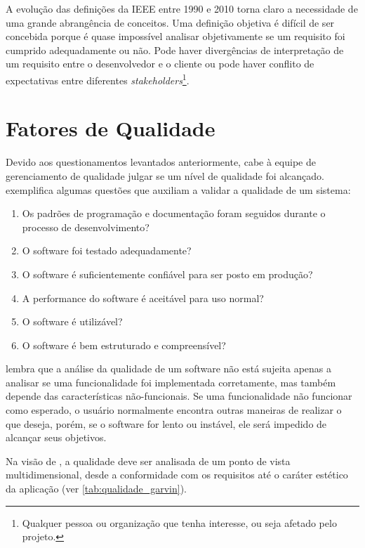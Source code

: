 \documentclass[
	12pt,				%
	openright,			%
	oneside,			%
	a4paper,			%
	english,			%
	brazil,				%
	]{abntex2}
\begin{document}
A evolução das definições da IEEE entre 1990 e 2010 torna claro a necessidade de uma grande abrangência de conceitos. Uma definição objetiva é difícil de ser concebida porque é quase impossível analisar objetivamente se um requisito foi cumprido adequadamente ou não. Pode haver divergências de interpretação de um requisito entre o desenvolvedor e o cliente ou pode haver conflito de expectativas entre diferentes \emph{stakeholders}\footnote{Qualquer pessoa ou organização que tenha interesse, ou seja afetado pelo projeto.}. %

\section{Fatores de Qualidade}

Devido aos questionamentos levantados anteriormente, cabe à equipe de gerenciamento de qualidade julgar se um nível de qualidade foi alcançado.  exemplifica algumas questões que auxiliam a validar a qualidade de um sistema:
\begin{enumerate}
    \item Os padrões de programação e documentação foram seguidos durante o processo de desenvolvimento?
    \item O software foi testado adequadamente?
    \item O software é suficientemente confiável para ser posto em produção?
    \item A performance do software é aceitável para uso normal?
    \item O software é utilizável?
    \item O software é bem estruturado e compreensível?
\end{enumerate}


 lembra que a análise da qualidade de um software não está sujeita apenas a analisar se uma funcionalidade foi implementada corretamente, mas também depende das características não-funcionais. Se uma funcionalidade não funcionar como esperado, o usuário normalmente encontra outras maneiras de realizar o que deseja, porém, se o software for lento ou instável, ele será impedido de alcançar seus objetivos.

Na visão de , a qualidade deve ser analisada de um ponto de vista multidimensional, desde a conformidade com os requisitos até o caráter estético da aplicação (ver \autoref{tab:qualidade_garvin}).
\end{document}

